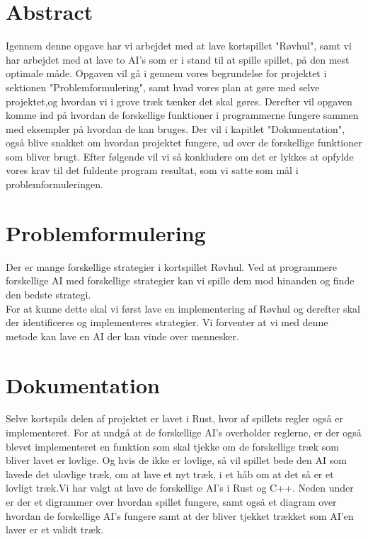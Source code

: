 \documentclass[a4paper, 12pt]{article}
\begin{document}
\section{Abstract}

Igennem denne opgave har vi arbejdet med at lave kortspillet "Røvhul", samt vi har arbejdet med at lave to AI's som er i stand til at spille spillet, på den mest optimale måde. Opgaven vil gå i gennem vores begrundelse for projektet i sektionen "Problemformulering", samt hvad vores plan at gøre med selve projektet,og hvordan vi i grove træk tænker det skal gøres.
\bigbreak
Derefter vil opgaven komme ind på hvordan de forskellige funktioner i programmerne fungere sammen med eksempler på hvordan de kan bruges. Der vil i kapitlet "Dokumentation", også blive snakket om hvordan projektet fungere, ud over de forskellige funktioner som bliver brugt. Efter følgende vil vi så konkludere om det er lykkes at opfylde vores krav til det fuldente program resultat, som vi satte som mål i problemformuleringen.

\section{Problemformulering}

Der er mange forskellige strategier i kortspillet Røvhul. Ved at programmere forskellige AI med forskellige strategier kan vi spille dem mod hinanden og finde den bedste strategi.
\\
For at kunne dette skal vi først lave en implementering af Røvhul og derefter skal der identificeres og implementeres strategier. Vi forventer at vi med denne metode kan lave en AI der kan vinde over mennesker.

\vfill
\pagebreak

\section{Dokumentation}
Selve kortspils delen af projektet er lavet i Rust, hvor af spillets regler også er implementeret. For at undgå at de forskellige AI's overholder reglerne, er der også blevet implementeret en funktion som skal tjekke om de forskellige træk som bliver lavet er lovlige. Og hvis de ikke er lovlige, så vil spillet bede den AI som lavede det ulovlige træk, om at lave et nyt træk, i et håb om at det så er et lovligt træk.Vi har valgt at lave de forskellige AI's i Rust og C++. Neden under er der et digrammer over hvordan spillet fungere, samt også et diagram over hvordan de forskellige AI's fungere samt at der bliver tjekket trækket som AI'en laver er et validt træk.
\end{document}
